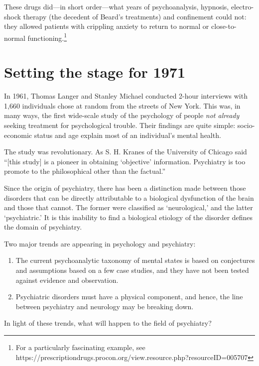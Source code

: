 \begin{refsection}
These drugs did---in short order---what years of psychoanalysis, hypnosis, electro-shock therapy (the decedent of Beard's treatments) and confinement could not: they allowed patients with crippling anxiety to return to normal or close-to-normal functioning.\footnote{For a particularly fascinating example, see https:\slash \slash prescriptiondrugs.procon.org\slash view.resource.php?resourceID=005707}

\section{Setting the stage for 1971}
\label{settingthestagefor1971}

In 1961, Thomas Langer and Stanley Michael conducted 2-hour interviews with 1,660 individuals chose at random from the streets of New York. This was, in many ways, the first wide-scale study of the psychology of people \emph{not already} seeking treatment for psychological trouble. Their findings are quite simple: socio-economic status and age explain most of an individual's mental health. 

The study was revolutionary. As S. H. Kranes of the University of Chicago said ``[this study] is a pioneer in obtaining `objective' information. Psychiatry is too promote to the philosophical other than the factual.'' ~\citep{Kraines:1964fy}

Since the origin of psychiatry, there has been a distinction made between those disorders that can be directly attributable to a biological dysfunction of the brain and those that cannot. The former were classified as `neurological,' and the latter `psychiatric.' It is this inability to find a biological etiology of the disorder defines the domain of psychiatry.

Two major trends are appearing in psychology and psychiatry: 

\begin{enumerate}
\item The current psychoanalytic taxonomy of mental states is based on conjectures and assumptions based on a few case studies, and they have not been tested against evidence and observation.

\item Psychiatric disorders must have a physical component, and hence, the line between psychiatry and neurology may be breaking down.

\end{enumerate}

In light of these trends, what will happen to the field of psychiatry?


\end{refsection}
